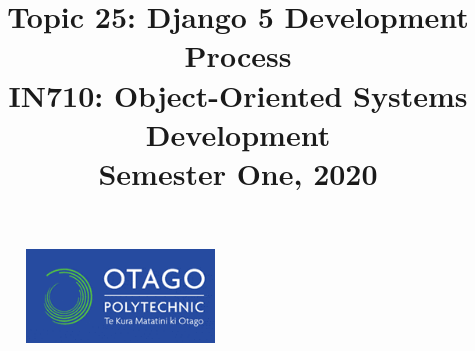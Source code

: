 \documentclass{article}
\author{}
\begin{document}
\begin{figure}
  \includegraphics[width=50mm]{../../resources/img/logo.png}
\end{figure}

\title{Topic 25: Django 5 Development Process\\IN710: Object-Oriented Systems Development\\Semester One, 2020}
\date{}
\maketitle
\end{document}
